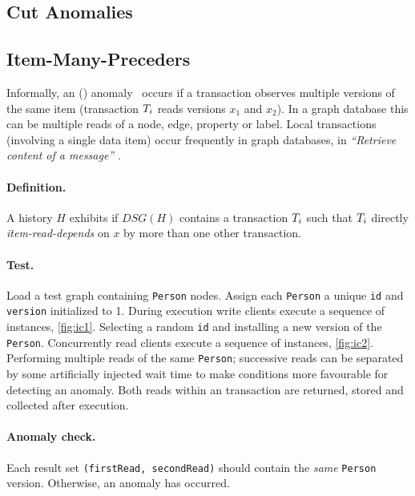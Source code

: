 \subsection{Cut Anomalies}

\subsection*{Item-Many-Preceders}
\label{sec:cut-anomalies}

Informally, an  () anomaly~\cite{DBLP:journals/pvldb/BailisDFGHS13} occurs if a transaction observes multiple versions of the same item (\eg transaction $T_i$ reads versions $x_1$ and $x_2$).
In a graph database this can be multiple reads of a node, edge, property or label.
Local transactions (involving a single data item) occur frequently in graph databases, \eg in \emph{``Retrieve content of a message''} .

\paragraph{Definition.}
A history $H$ exhibits  if $\textit{DSG}(H)$ contains a transaction $T_i$ such that $T_i$ directly \emph{item-read-depends} on $x$ by more than one other transaction.

\paragraph{Test.}
Load a test graph containing \texttt{Person} nodes.
Assign each \texttt{Person} a unique \texttt{id} and \texttt{version} initialized to 1.
During execution write clients execute a sequence of  instances, \autoref{fig:ic1}.
Selecting a random \texttt{id} and installing a new version of the \texttt{Person}.
Concurrently read clients execute a sequence of  instances, \autoref{fig:ic2}.
Performing multiple reads of the same \texttt{Person}; successive reads can be separated by some artificially injected wait time to make conditions more favourable for detecting an anomaly.
Both reads within an  transaction are returned, stored and collected after execution.

\paragraph{Anomaly check.}
Each  result set \texttt{(firstRead, secondRead)} should contain the \emph{same} \texttt{Person} version.
Otherwise, an  anomaly has occurred.

